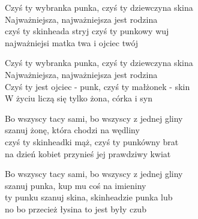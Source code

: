 \begin{text}
Czyś ty wybranka punka, czyś ty dziewczyna skina\\
Najważniejsza, najważniejsza jest rodzina\\
czyś ty skinheada stryj czyś ty punkowy wuj\\
najważniejsi matka twa i ojciec twój

Czyś ty wybranka punka, czyś ty dziewczyna skina\\
Najważniejsza, najważniejsza jest rodzina\\
Czyś ty jest ojciec - punk, czyś ty małżonek - skin\\
W życiu liczą się tylko żona, córka i syn

Bo wszyscy tacy sami, bo wszyscy z jednej gliny\\
szanuj żonę, która chodzi na wędliny\\
czyś ty skinheadki mąż, czyś ty punkówny brat\\
na dzień kobiet przynieś jej prawdziwy kwiat

Bo wszyscy tacy sami, bo wszyscy z jednej gliny\\
szanuj punka, kup mu coś na imieniny\\
ty punku szanuj skina, skinheadzie punka lub\\
no bo przecież łysina to jest były czub
\end{text}
\begin{chord}
\end{chord}